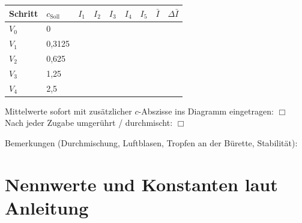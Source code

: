 \documentclass{article}
\newcommand{\bl}[1][2cm]{\underline{\hspace{#1}}}
\newcommand{\zh}{\rule[-0.45cm]{0pt}{1.1cm}}
\newcommand{\ak}{$\Box$}
\newcommand{\cunit}{\SI{e-6}{mol/l}}
\begin{document}
\begin{center}
{\small\setlength{\tabcolsep}{3pt}
\begin{tabular}{|C{1.2cm}|C{1.8cm}|C{1.45cm}|C{1.45cm}|C{1.45cm}|C{1.45cm}|C{1.45cm}|C{1.75cm}|C{1.75cm}|}
  \hline
  \zh \textbf{Schritt} & $c_\mathrm{Soll}$ \newline [\cunit] &
  $I_1$ \newline [\si{\counts}] & $I_2$ \newline [\si{\counts}] &
  $I_3$ \newline [\si{\counts}] & $I_4$ \newline [\si{\counts}] &
  $I_5$ \newline [\si{\counts}] &
  $\bar{I}$ \newline [\si{\counts}] & $\Delta\bar{I}$ \newline [\si{\counts}] \\
  \hline
  $V_0$ & 0    & & & & & & & \zh \\ \hline
  $V_1$ & 0,3125 & & & & & & & \zh \\ \hline
  $V_2$ & 0,625  & & & & & & & \zh \\ \hline
  $V_3$ & 1,25   & & & & & & & \zh \\ \hline
  $V_4$ & 2,5    & & & & & & & \zh \\ \hline
\end{tabular}}
\end{center}

\vspace{0.1cm}
\noindent Mittelwerte sofort mit zus\"atzlicher $c$-Abszisse ins Diagramm
eingetragen: \ak{} \qquad
Nach jeder Zugabe umger\"uhrt / durchmischt: \ak{}

\vspace{0.4cm}

\noindent Bemerkungen (Durchmischung, Luftblasen, Tropfen an der B\"urette,
Stabilit\"at):

\vspace{0.2cm}
\noindent \bl[15cm]

\vspace{0.6cm}
\noindent \bl[15cm]

\vspace{0.6cm}
\noindent \bl[15cm]

\newpage

\section{Nennwerte und Konstanten laut Anleitung}
\end{document}
